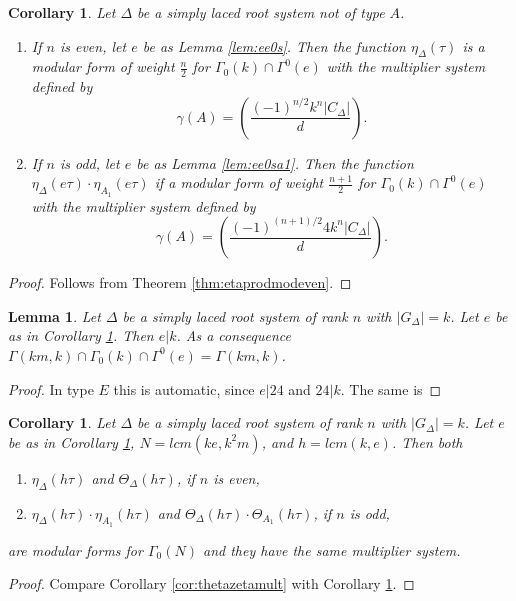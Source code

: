 \documentclass[11pt,a4paper]{amsart}
\newtheorem{lemma}[theorem]{Lemma}
\newtheorem{corollary}[theorem]{Corollary}
\theoremstyle{definition}
\begin{document}
\begin{corollary}  Let $\Delta$ be a simply laced root system not of type $A$. 
\begin{enumerate}
\item If $n$ is even, let $e$ be as Lemma \ref{lem:ee0s}. Then the function $\eta_{\Delta}(\tau)$ is a modular form of weight $\frac{n}{2}$ for $\Gamma_0(k)\cap\Gamma^0(e)$ with the multiplier system defined by
\[ \gamma(A)=\left( \frac{(-1)^{n/2}k^n|C_{\Delta}|}{d} \right). \]
\item If $n$ is odd, let $e$ be as Lemma \ref{lem:ee0sa1}. Then the function $\eta_{\Delta}(e\tau) \cdot \eta_{A_1}(e\tau) $ if a modular form of weight $\frac{n+1}{2}$ for $\Gamma_0(k)\cap\Gamma^0(e)$ with the multiplier system defined by
\[ \gamma(A)=\left( \frac{(-1)^{(n+1)/2}4k^n|C_{\Delta}|}{d} \right). \]
\end{enumerate}
\label{cor:etamultsyscalc}
\end{corollary}
\begin{proof} Follows from Theorem \ref{thm:etaprodmodeven}.
\end{proof}


\begin{lemma}Let $\Delta$ be a simply laced root system of rank $n$ with $|G_{\Delta}|=k$. Let $e$ be as in Corollary \ref{cor:etamultsyscalc}. Then $e|k$. As a consequence $\Gamma(km,k) \cap \Gamma_0(k) \cap \Gamma^0(e)=\Gamma(km,k)$.
\end{lemma}
\begin{proof}
In type $E$ this is automatic, since $e|24$ and $24|k$. The same is
\end{proof}

\begin{corollary} Let $\Delta$ be a simply laced root system of rank $n$ with $|G_{\Delta}|=k$. Let $e$ be as in Corollary \ref{cor:etamultsyscalc}, $N=lcm(ke,k^2m)$, and 
$h=lcm(k,e)$.  
Then both
\begin{enumerate}
\item  $\eta_{\Delta}(h\tau)$  and $\Theta_{\Delta}(h\tau)$, if $n$  is even,
\item $\eta_{\Delta}(h\tau) \cdot \eta_{A_1}(h\tau)$ and $\Theta_{\Delta}(h\tau) \cdot \Theta_{A_1}(h\tau)$,  if $n$ is odd,
\end{enumerate}
are modular forms for $\Gamma_0(N)$ and they have the same multiplier system.
\label{cor:etathetamod}
\end{corollary}
\begin{proof}
Compare Corollary \ref{cor:thetazetamult} with Corollary \ref{cor:etamultsyscalc}.
\end{proof}
\end{document}
